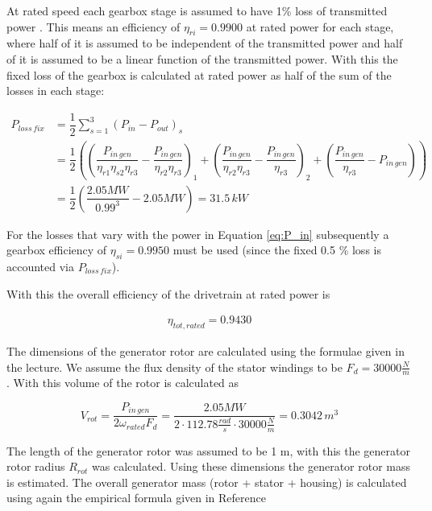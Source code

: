 At rated speed each gearbox stage is assumed to have 1\% loss of transmitted power \cite{hau}. This means an efficiency of $\eta_{ri} = 0.9900$ at rated power for each stage, where half of it is assumed to be independent of the transmitted power and half of it is assumed to be a linear function of the transmitted power. With this the fixed loss of the gearbox is calculated at rated power as half of the sum of the losses in each stage: 

\begin{align}
    P_{loss\,fix} &= \dfrac{1}{2} \sum \limits_{s = 1}^{3} \left( P_{in} - P_{out}\right)_{s}\\
    &= \dfrac{1}{2} \left( \left( \dfrac{P_{in\,gen}}{\eta_{r1}\eta_{s2} \eta_{r3}} - \dfrac{P_{in\,gen}}{\eta_{r2} \eta_{r3}} \right)_{1} + \left( \dfrac{P_{in\,gen}}{\eta_{r2} \eta_{r3}} - \dfrac{P_{in\,gen}}{\eta_{r3}}\right)_{2}+ \left( \dfrac{P_{in\,gen}}{\eta_{r3}} - P_{in\,gen} \right) \right)\\
    &= \dfrac{1}{2} \left( \dfrac{2.05 MW}{0.99^3} - 2.05 MW \right) = 31.5 \,kW
\label{eq:Ploss_fix}
\end{align}

For the losses that vary with the power in Equation \ref{eq:P_in} subsequently a gearbox efficiency of $\eta_{si} = 0.9950$ must be used (since the fixed 0.5 \% loss is accounted via $P_{loss \, fix}$).

With this the overall efficiency of the drivetrain at rated power is

\begin{align}
\eta_{tot, rated} = 0.9430    
\end{align}

The dimensions of the generator rotor are calculated using the formulae given in the lecture. We assume the flux density of the stator windings to be $F_d = 30000 \frac{N}{m}$. With this volume of the rotor is calculated as

\begin{equation}
    V_{rot} = \dfrac{P_{in \, gen}}{2 \omega_{rated} F_d} = \dfrac{2.05 MW}{2 \cdot 112.78 \frac{rad}{s} \cdot 30000 \frac{N}{m}} = 0.3042 \,m^3
\end{equation}

The length of the generator rotor was assumed to be 1 m, with this the generator rotor radius $R_{rot}$ was calculated. Using these dimensions the generator rotor mass is estimated. The overall generator mass (rotor + stator + housing) is calculated using again the empirical formula given in Reference~\cite{Fingersh2006}

